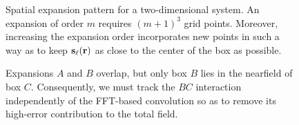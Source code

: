 \begin{figure}
  \centering
  \caption{\label{fig:expansion grid}Spatial expansion pattern for a two-dimensional system.
    An expansion of order $m$ requires $(m + 1)^3$ grid points.
    Moreover, increasing the expansion order incorporates new points in such a way as to keep $\vb{s}_\ell(\vb{r})$ as close to the center of the box as possible.
  }
\end{figure}

\begin{figure}
  \centering
  \caption{\label{fig:nearfield correction}Expansions $A$ and $B$ overlap, but only box $B$ lies in the nearfield of box $C$.
    Consequently, we must track the $BC$ interaction independently of the FFT-based convolution so as to remove its high-error contribution to the total field.
  }
\end{figure}

